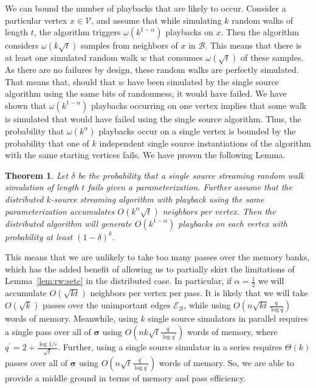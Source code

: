\documentclass[10]{article}
\newtheorem{theorem}{Theorem}[section]
\begin{document}
We can bound the number of playbacks that are likely to occur.
Consider a particular vertex $x \in \mathcal{V}$, and assume that while simulating $k$ random walks of length $t$, the algorithm triggers $\omega \left ( k^{1 - \alpha} \right )$ playbacks on $x$.
Then the algorithm considers $\omega \left ( k \sqrt{t}\right )$ samples from neighbors of $x$ in $\mathcal{B}$. 
This means that there is at least one simulated random walk $w$ that consumes $\omega(\sqrt{t})$ of these samples.
As there are no failures by design, these random walks are perfectly simulated.
That means that, should that $w$ have been simulated by the single source algorithm using the same bits of randomness, it would have failed. 
We have shown that $\omega(k^{1 - \alpha})$ playbacks occurring on one vertex implies that some walk is simulated that would have failed using the single source algorithm. 
Thus, the probability that $\omega(k^\alpha)$ playbacks occur on a single vertex is bounded by the probability that one of $k$ independent single source instantiations of the algorithm with the same starting vertices fails. 
We have proven the following Lemma.

\begin{theorem} \label{thm:playback:bound}
Let $\delta$ be the probability that a single source streaming random walk simulation of length $t$ fails given a parameterization.
Further assume that the distributed $k$-source streaming algorithm with playback using the same parameterization accumulates $O(k^\alpha \sqrt{t})$ neighbors per vertex.
Then the distributed algorithm will generate $O(k^{1-\alpha})$ playbacks on each vertex with probability at least $(1 - \delta)^k$.
\end{theorem}

This means that we are unlikely to take too many passes over the memory banks, which has the added benefit of allowing us to partially skirt the limitations of Lemma~\ref{lem:rw:setc} in the distributed case.
In particular, if $\alpha=\frac{1}{2}$ we will accumulate $O(\sqrt{kt})$ neighbors per vertex per pass.
It is likely that we will take $O(\sqrt{k})$ passes over the unimportant edges $\mathcal{E}_\mathcal{B}$, while using $O \left (n\sqrt{kt}\frac{q}{\log q} \right )$ words of memory.
Meanwhile, using $k$ single source simulators in parallel requires a single pass over all of $\boldsymbol{\sigma}$ using $O\left (nk\sqrt{t}\frac{q^\prime}{\log q^\prime} \right )$ words of memory, where $q^\prime = 2 + \frac{\log 1/\varepsilon}{\sqrt{t}}$.
Further, using a single source simulator in a series requires $\Theta(k)$ passes over all of $\boldsymbol{\sigma}$ using $O\left (n\sqrt{t}\frac{q^\prime}{\log q^\prime} \right )$ words of memory.
So, we are able to provide a middle ground in terms of memory and pass efficiency.
\end{document}
